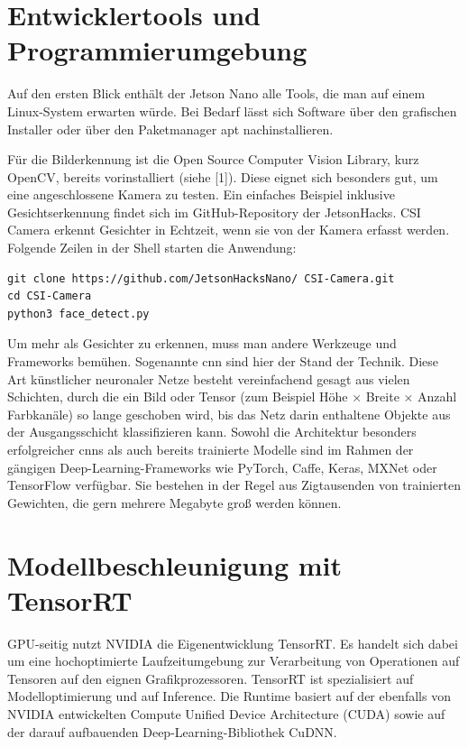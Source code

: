 \section{Entwicklertools und Programmierumgebung}

Auf den ersten Blick enthält der Jetson Nano alle Tools, die man auf einem Linux-­System erwarten würde. Bei Bedarf lässt sich Software über den grafischen Installer oder über den Paketmanager apt nach­installieren. 

Für die Bilderkennung ist die Open Source Computer Vision Library, kurz OpenCV, bereits vorinstalliert (siehe [1]). Diese eignet sich besonders gut, um eine angeschlossene Kamera zu testen. Ein einfaches Beispiel inklusive Gesichtserkennung findet sich im GitHub-Repository der JetsonHacks. CSI Camera erkennt Gesichter in Echtzeit, wenn sie von der Kamera erfasst werden. Folgende Zeilen in der Shell starten die Anwendung: 

\begin{lstlisting}
git clone https://github.com/JetsonHacksNano/ CSI-Camera.git
cd CSI-Camera
python3 face_detect.py
\end{lstlisting}

Um mehr als Gesichter zu erkennen, muss man andere Werkzeuge und Frameworks bemühen. Sogenannte \ac{cnn} sind hier der Stand der Technik. Diese Art künstlicher neuronaler Netze besteht verein­fachend gesagt aus vielen Schichten, durch die ein Bild oder Tensor (zum Beispiel Höhe × Breite × Anzahl Farbkanäle) so lange geschoben wird, bis das Netz darin enthaltene Objekte aus der Ausgangsschicht klassifizieren kann. Sowohl die Architektur besonders erfolgreicher \ac{cnn}s als auch bereits trainierte Modelle sind im Rahmen der gängigen Deep-Learning-­Frameworks wie PyTorch, Caffe, Keras, MXNet oder TensorFlow verfügbar. Sie bestehen in der Regel aus Zigtausenden von trainierten Gewichten, die gern mehrere Megabyte groß werden können. 


\section{Modellbeschleunigung mit TensorRT}

GPU-seitig nutzt NVIDIA die Eigenentwicklung TensorRT. Es handelt sich dabei um eine hochoptimierte Laufzeitumgebung zur Verarbeitung von Operationen auf Tensoren auf den eignen Grafikprozessoren. TensorRT ist spezialisiert auf Modelloptimierung und auf Inference. Die Runtime basiert auf der ebenfalls von NVIDIA entwickelten Compute Unified Device Architecture (CUDA) sowie auf der darauf aufbauenden Deep-Learning-­Bibliothek CuDNN. 

